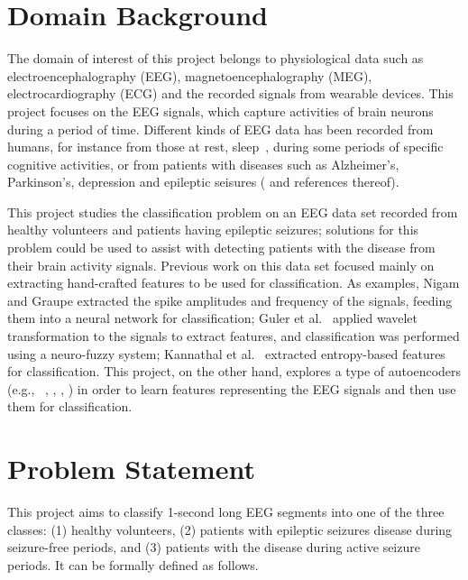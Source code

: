 \documentclass[12pt]{article}
\begin{document}
\maketitle

\section{Domain Background}

\noindent
The domain of interest of this project belongs to physiological data such as electroencephalography (EEG), magnetoencephalography (MEG), electrocardiography (ECG) and the recorded signals from wearable devices. This project focuses on the EEG signals, which capture activities of brain neurons during a period of time. Different kinds of EEG data has been recorded from humans, for instance from those at rest, sleep~\cite{langkvist2012sleep}, during some periods of specific cognitive activities, or from patients with diseases such as Alzheimer's, Parkinson's, depression and epileptic seisures (\cite{andrzejak2001indications} and references thereof).

This project studies the classification problem on an EEG data set recorded from healthy volunteers and patients having epileptic seizures; solutions for this problem could be used to assist with detecting patients with the disease from their brain activity signals. Previous work on this data set focused mainly on extracting hand-crafted features to be used for classification. As examples, Nigam and Graupe \cite{nigam2004neural} extracted the spike amplitudes and frequency of the signals, feeding them into a neural network for classification; Guler et al.~\cite{guler2005recurrent} applied wavelet transformation to the signals to extract features, and classification was performed using a neuro-fuzzy system; Kannathal et al.~\cite{kannathal2005entropies} extracted entropy-based features for classification. This project, on the other hand, explores a type of autoencoders (e.g., ~\cite{bengio2007greedy}, \cite{vincent2010stacked}, \cite{boureau2008sparse}, \cite{kingma2013auto}) in order to learn features representing the EEG signals and then use them for classification.

\section{Problem Statement}
\noindent
This project aims to classify 1-second long EEG segments into one of the three classes: (1) healthy volunteers, (2) patients with epileptic seizures disease during seizure-free periods, and (3) patients with the disease during active seizure periods. It can be formally defined as follows.
\end{document}
